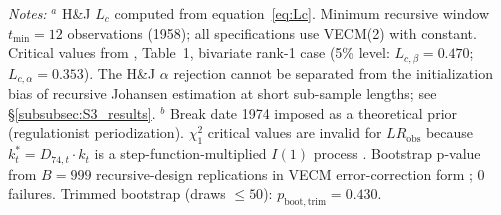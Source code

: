 \begin{table}[H]
\begin{tabular}{@{}llccc@{}}
\bottomrule
\end{tabular}
\par\medskip
\begin{minipage}{\textwidth}
\footnotesize
\textit{Notes:}
$^a$ H\&J $L_c$ computed from equation~\eqref{eq:Lc}.
Minimum recursive window $t_{\min} = 12$ observations (1958);
all specifications use VECM(2) with constant.
Critical values from \citet{HansenJohansen1999}, Table~1,
bivariate rank-1 case (5\% level: $L_{c,\beta}=0.470$;
$L_{c,\alpha}=0.353$). The H\&J $\alpha$ rejection cannot be separated
from the initialization bias of recursive Johansen estimation at short
sub-sample lengths; see \S\ref{subsubsec:S3_results}.
$^b$ Break date 1974 imposed as a theoretical prior (regulationist
periodization). $\chi^2_1$ critical values are invalid for $LR_{\mathrm{obs}}$
because $k_t^* = D_{74,t}\cdot k_t$ is a step-function-multiplied
$I(1)$ process \citep[Remark~3.1]{JMN2000}. Bootstrap p-value from
$B = 999$ recursive-design replications in VECM error-correction form
\citep{CRT2012}; 0 failures. Trimmed bootstrap (draws $\leq 50$):
$p_{\mathrm{boot,trim}} = 0.430$.
\end{minipage}
\end{table}
